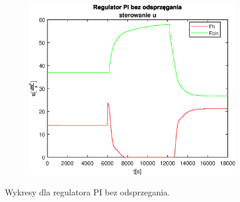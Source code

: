 \begin{figure}[h!]
   \begin{subfigure}[b]{0.4\textwidth}
      \includegraphics[width=1\linewidth]{img/PI/noDecoupler/noDisturbance/PINoDecouplerControl1Lintrue.eps}
      \caption{}
      \label{fig:fig:PINodDecoupler1Lintrue3}
   \end{subfigure}
       
   \caption{Wykresy dla regulatora PI bez odsprzegania.}
   \label{fig:PINodDecoupler1Lintrue}
\end{figure}
           

